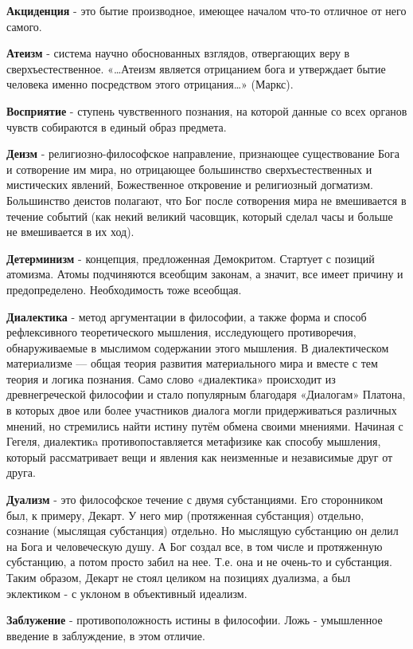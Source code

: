 \documentclass[12pt,a4paper]{article}
\begin{document}
\textbf{Акциденция} - это бытие производное, имеющее началом что-то отличное от него самого.

\textbf{Атеизм} -  система научно обоснованных взглядов, отвергающих веру в сверхъестественное. «…Атеизм является отрицанием бога и утверждает бытие человека именно посредством этого отрицания…» (Маркс).

\textbf{Восприятие} - ступень чувственного познания, на которой данные со всех органов чувств собираются в единый образ предмета.

\textbf{Деизм} -  религиозно-философское направление, признающее существование Бога и сотворение им мира, но отрицающее большинство сверхъестественных и мистических явлений, Божественное откровение и религиозный догматизм. Большинство деистов полагают, что Бог после сотворения мира не вмешивается в течение событий (как некий великий часовщик, который сделал часы и больше не вмешивается в их ход).

\textbf{Детерминизм} - концепция, предложенная Демокритом. Стартует с позиций атомизма. Атомы подчиняются всеобщим законам, а значит, все имеет причину и предопределено. Необходимость тоже всеобщая.

\textbf{Диалектика} - метод аргументации в философии, а также форма и способ рефлексивного теоретического мышления, исследующего противоречия, обнаруживаемые в мыслимом содержании этого мышления. В диалектическом материализме — общая теория развития материального мира и вместе с тем теория и логика познания. Само слово «диалектика» происходит из древнегреческой философии и стало популярным благодаря «Диалогам» Платона, в которых двое или более участников диалога могли придерживаться различных мнений, но стремились найти истину путём обмена своими мнениями. Начиная с Гегеля, диалектикa противопоставляется метафизике как способу мышления, который рассматривает вещи и явления как неизменные и независимые друг от друга.

\textbf{Дуализм} - это философское течение с двумя субстанциями. Его сторонником был, к примеру, Декарт. У него мир (протяженная субстанция) отдельно, сознание (мыслящая субстанция) отдельно. Но мыслящую субстанцию он делил на Бога и человеческую душу. А Бог создал все, в том числе и протяженную субстанцию, а потом просто забил на нее. Т.е. она и не очень-то и субстанция. Таким образом, Декарт не стоял целиком на позициях дуализма, а был эклектиком - с уклоном в объективный идеализм. 

\textbf{Заблужение} - противоположность истины в философии. Ложь - умышленное введение в заблуждение, в этом отличие.
\end{document}
